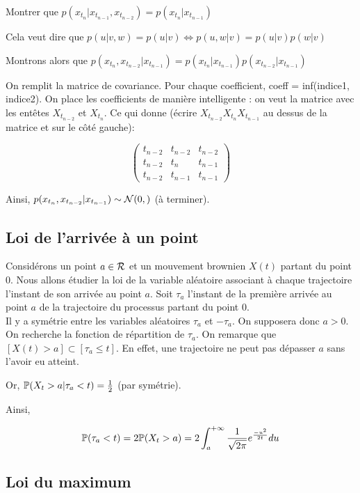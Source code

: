  Montrer que $p(x_{t_n} \vert x_{t_{n-1}}, x_{t_{n-2}}) = p(x_{t_n} \vert x_{t_{n-1}})$

\Rq Cela veut dire que $p(u\vert v,w) = p(u \vert v) \Leftrightarrow p(u,w\vert v) = p(u\vert v)p(w \vert v)$

Montrons alors que $p(x_{t_n},x_{t_{n-2}} \vert x_{t_{n-1}}) = p(x_{t_n}\vert x_{t_{n-1}})p(x_{t_{n-2}} \vert x_{t_{n-1}})$ 

On remplit la matrice de covariance. Pour chaque coefficient, \og coeff = inf(indice1, indice2)\fg{}. On place les coefficients de manière \og intelligente \fg{} : on veut la matrice avec les entêtes $X_{t_{n-2}}$ et $X_{t_n}$. Ce qui donne (écrire $X_{t_{n-2}} X_{t_n} X_{t_{n-1}}$ au dessus de la matrice et sur le côté gauche): 

\[
\begin{pmatrix}
  t_{n-2} & t_{n-2} & t_{n-2} \\
  t_{n-2} & t_{n}   & t_{n-1} \\
  t_{n-2} & t_{n-1} & t_{n-1}
\end{pmatrix}
\]

Ainsi, $p(x_{t_n}, x_{t_{n-2}} \vert x_{t_{n-1}}) \sim \Normale(0,)$ (à terminer).


\subsection{Loi de l'arrivée à un point}
Considérons un point $a\in \R$ et un mouvement brownien $X(t)$ partant du point $0$. Nous allons étudier la loi de la variable aléatoire associant à chaque trajectoire l'instant de son arrivée au point $a$. Soit $\tau_a$ l'instant de la première arrivée au point $a$ de la trajectoire du processus partant du point $0$.  \\

\Rq Il y a symétrie entre les variables aléatoires $\tau_a$ et $-\tau_a$. On supposera donc $a>0$. \\

On recherche la fonction de répartition de $\tau_a$. On remarque que $[X(t) > a] \subset [\tau_a \leq t]$. En effet, une trajectoire ne peut pas dépasser $a$ sans l'avoir eu atteint.

Or, $\P(X_t > a \vert \tau_a < t) = \frac{1}{2}$ (par symétrie).

Ainsi,

\[ \P(\tau_a < t) = 2\P(X_t > a) = 2 \int_a^{+\infty} \frac{1}{\sqrt{2\pi}} e^{\frac{-u^2}{2t}} du \]

\subsection{Loi du maximum}

